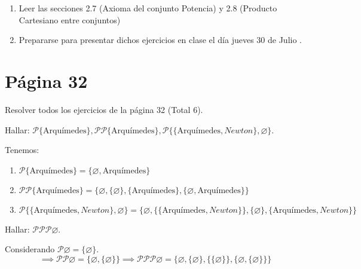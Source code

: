 





\begin{enumerate}
	\item Leer las secciones 2.7 (Axioma del conjunto Potencia) y 2.8 (Producto Cartesiano entre conjuntos)
	\item Prepararse para presentar dichos ejercicios en clase el día jueves 30 de Julio .
\end{enumerate}
\section{Página 32}
	Resolver todos los ejercicios de la página 32 (Total 6).
	
	\begin{problema}
		Hallar: $\mathcal{P}\{\text{Arquímedes} \}, \mathcal{P}\mathcal{P}\{\text{Arquímedes} \}, \mathcal{P}\{\{\text{Arquímedes}, Newton \},\varnothing \}$.
	\end{problema}
	\begin{sol}
		Tenemos: 
		\begin{enumerate}
			\item $\mathcal{P}\{\text{Arquímedes} \}=\{\varnothing, \text{Arquímedes} \}$
			\item $\mathcal{P}\mathcal{P}\{\text{Arquímedes} \}=\{\varnothing,\{\varnothing\},\{\text{Arquímedes} \},  \{\varnothing, \text{Arquímedes} \}\}$
			\item $\mathcal{P}\{\{\text{Arquímedes}, Newton \},\varnothing \}=\{\varnothing,\{\{\text{Arquímedes}, Newton \}\}, \{\varnothing\}, \{\text{Arquímedes}, Newton \}\}$
		\end{enumerate}
	\end{sol}


	\begin{problema}
	Hallar: $\mathcal{P}\mathcal{P}\mathcal{P}\varnothing$.
\end{problema}
\begin{sol}
	Considerando $\mathcal{P}\varnothing =\{\varnothing\}$. 
	$$\implies \mathcal{P}\mathcal{P}\varnothing= \{\varnothing,\{\varnothing\}\}\implies \mathcal{P}\mathcal{P}\mathcal{P}\varnothing= \{\varnothing,\{\varnothing\},\{\{\varnothing\}\}, \{\varnothing,\{\varnothing\}\} \} $$
\end{sol}

